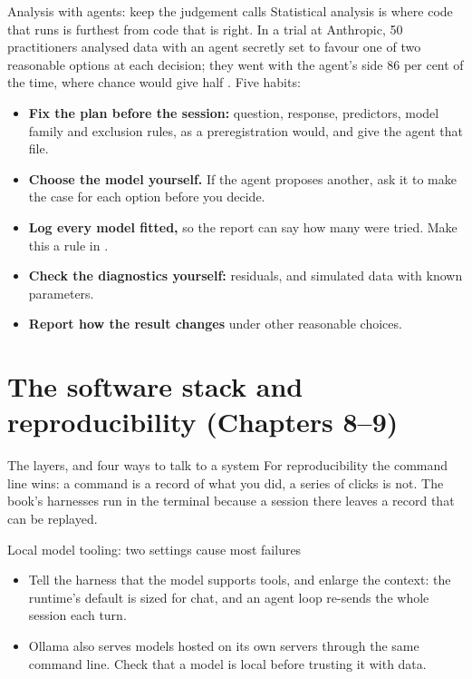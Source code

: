 \documentclass[11pt,aspectratio=169]{beamer}
\begin{document}
\begin{frame}{Analysis with agents: keep the judgement calls}
  Statistical analysis is where code that runs is furthest from code that
  is right. In a trial at Anthropic, 50 practitioners analysed data with an
  agent secretly set to favour one of two reasonable options at each
  decision; they went with the agent's side 86 per cent of the time, where
  chance would give half \parencite{herdagdelen2026aligned}. Five habits:
  \begin{itemize}\small
    \item \textbf{Fix the plan before the session:} question, response,
      predictors, model family and exclusion rules, as a preregistration
      would, and give the agent that file.
    \item \textbf{Choose the model yourself.} If the agent proposes another,
      ask it to make the case for each option before you decide.
    \item \textbf{Log every model fitted,} so the report can say how many
      were tried. Make this a rule in .
    \item \textbf{Check the diagnostics yourself:} residuals, and simulated
      data with known parameters.
    \item \textbf{Report how the result changes} under other reasonable
      choices.
  \end{itemize}
\end{frame}

\section{The software stack and reproducibility (Chapters 8--9)}

\begin{frame}{The layers, and four ways to talk to a system}
  \begingroup{}\endgroup
  For reproducibility the command line wins: a command is a record of what
  you did, a series of clicks is not. The book's harnesses run in the
  terminal because a session there leaves a record that can be replayed.
\end{frame}

\begin{frame}{Local model tooling: two settings cause most failures}
  \begingroup{}\endgroup
  \begin{itemize}
    \item Tell the harness that the model supports tools, and enlarge the
      context: the runtime's default is sized for chat, and an agent loop
      re-sends the whole session each turn.
    \item Ollama also serves models hosted on its own servers through the
      same command line. Check that a model is local before trusting it
      with data.
  \end{itemize}
\end{frame}
\end{document}
